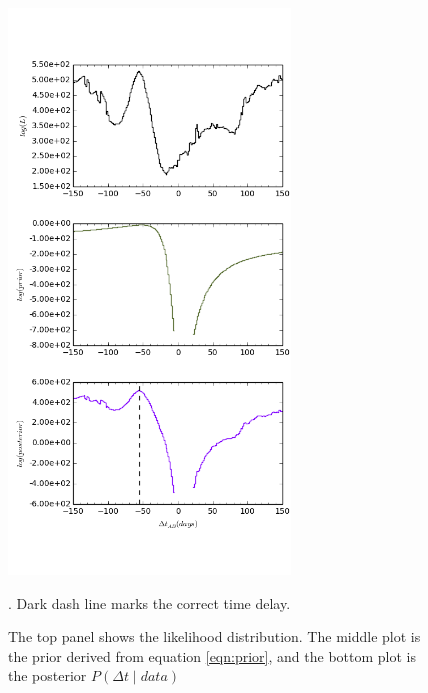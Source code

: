 \documentclass[\docopts]{\docclass}
\begin{document}
\begin{enumerate}
\begin{figure}[!h]
\includegraphics[width=\textwidth, height=15cm, keepaspectratio]{data1_full_log.png}
\caption{The top panel shows the likelihood distribution. The middle plot is the prior derived from equation \ref{eqn:prior}, and the bottom plot is the posterior $P(\Delta t \mid data)$ }. Dark dash line marks the correct time delay.
\label{fig:log_data1}
\end{figure}
\end{enumerate}
\end{document}
